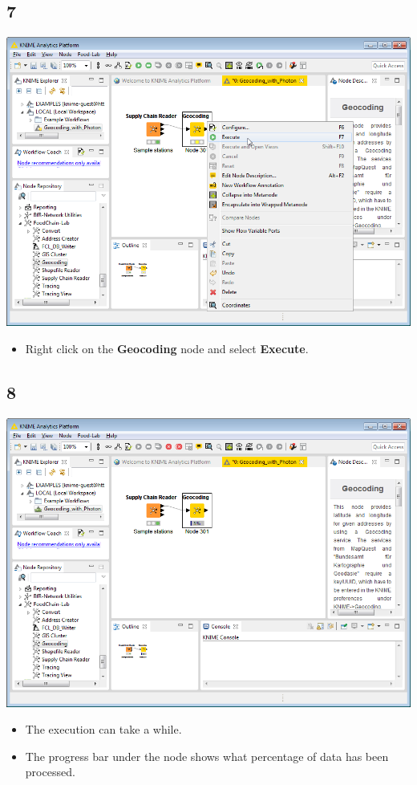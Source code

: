 \documentclass{beamer}
\begin{document}
\subsection{7}
\begin{frame}
	\begin{center}
  		\includegraphics[height=0.6\textheight]{7.png}
	\end{center}
	\begin{itemize}
		\item Right click on the \textbf{Geocoding} node and select \textbf{Execute}.
	\end{itemize}
\end{frame}

\subsection{8}
\begin{frame}
	\begin{center}
  		\includegraphics[height=0.6\textheight]{8.png}
	\end{center}
	\begin{itemize}
		\item The execution can take a while.
		\item The progress bar under the node shows what percentage of data has been processed.
	\end{itemize}
\end{frame}
\end{document}
